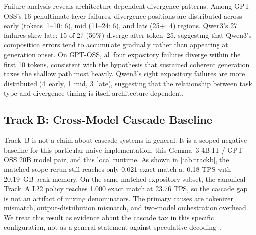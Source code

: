 \documentclass[11pt]{article}
\begin{document}
Failure analysis reveals architecture-dependent divergence patterns. Among GPT-OSS's 16 penultimate-layer failures, divergence positions are distributed across early (tokens~1--10: 6), mid (11--24: 6), and late (25+: 4) regions. Qwen3's 27 failures skew late: 15 of 27 (56\%) diverge after token~25, suggesting that Qwen3's composition errors tend to accumulate gradually rather than appearing at generation onset. On GPT-OSS, all four expository failures diverge within the first 10 tokens, consistent with the hypothesis that sustained coherent generation taxes the shallow path most heavily. Qwen3's eight expository failures are more distributed (4~early, 1~mid, 3~late), suggesting that the relationship between task type and divergence timing is itself architecture-dependent.

\subsection{Track B: Cross-Model Cascade Baseline}

\begin{table}[t]
\centering
\small
\caption{Track~B comparison on the local Apple MLX runtime. The Track~A row is recomputed on the same shared expository subset ($P2$--$P5$ scored after warmup) for matched-scope context.}
\label{tab:trackb}
\end{table}

Track~B is not a claim about cascade systems in general. It is a scoped negative baseline for this particular naive implementation, this Gemma~3 4B-IT / GPT-OSS 20B model pair, and this local runtime. As shown in \cref{tab:trackb}, the matched-scope rerun still reaches only 0.021 exact match at 0.18 TPS with 20.19~GB peak memory. On the same matched expository subset, the canonical Track~A L22 policy reaches 1.000 exact match at 23.76 TPS, so the cascade gap is not an artifact of mixing denominators. The primary causes are tokenizer mismatch, output-distribution mismatch, and two-model orchestration overhead. We treat this result as evidence about the cascade tax in this specific configuration, not as a general statement against speculative decoding~\cite{leviathan2023speculative}.
\end{document}
